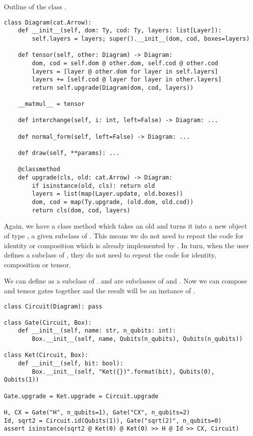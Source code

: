 \begin{python}
{\normalfont Outline of the class .}
\begin{verbatim}
class Diagram(cat.Arrow):
    def __init__(self, dom: Ty, cod: Ty, layers: list[Layer]):
        self.layers = layers; super().__init__(dom, cod, boxes=layers)

    def tensor(self, other: Diagram) -> Diagram:
        dom, cod = self.dom @ other.dom, self.cod @ other.cod
        layers = [layer @ other.dom for layer in self.layers]
        layers += [self.cod @ layer for layer in other.layers]
        return self.upgrade(Diagram(dom, cod, layers))

    __matmul__ = tensor

    def interchange(self, i: int, left=False) -> Diagram: ...

    def normal_form(self, left=False) -> Diagram: ...

    def draw(self, **params): ...

    @classmethod
    def upgrade(cls, old: cat.Arrow) -> Diagram:
        if isinstance(old, cls): return old
        layers = list(map(Layer.update, old.boxes))
        dom, cod = map(Ty.upgrade, (old.dom, old.cod))
        return cls(dom, cod, layers)
\end{verbatim}
\end{python}

Again, we have a class method  which takes an old  and turns it into a new object of type , a given subclass of .
This means we do not need to repeat the code for identity or composition which is already implemented by .
In turn, when the user defines a subclass of , they do not need to repeat the code for identity, composition or tensor.

\begin{example}
We can define  as a subclass of .  and  are subclasses of  and .
Now we can compose and tensor gates together and the result will be an instance of .

\begin{verbatim}
class Circuit(Diagram): pass

class Gate(Circuit, Box):
    def __init__(self, name: str, n_qubits: int):
        Box.__init__(self, name, Qubits(n_qubits), Qubits(n_qubits))

class Ket(Circuit, Box):
    def __init__(self, bit: bool):
        Box.__init__(self, "Ket({})".format(bit), Qubits(0), Qubits(1))

Gate.upgrade = Ket.upgrade = Circuit.upgrade

H, CX = Gate("H", n_qubits=1), Gate("CX", n_qubits=2)
Id, sqrt2 = Circuit.id(Qubits(1)), Gate("sqrt(2)", n_qubits=0)
assert isinstance(sqrt2 @ Ket(0) @ Ket(0) >> H @ Id >> CX, Circuit)
\end{verbatim}
\end{example}

